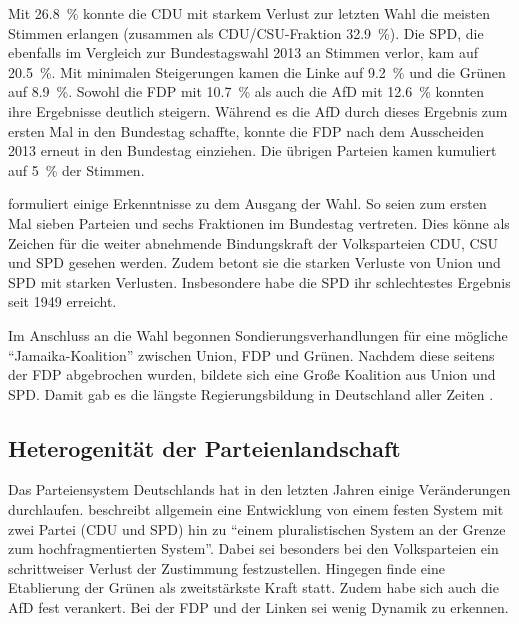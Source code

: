 Mit \SI{26.8}{\percent} konnte die \ac{CDU} mit starkem Verlust zur letzten Wahl die meisten Stimmen erlangen (zusammen als \ac{CDU}/\acs{CSU}-Fraktion \SI{32.9}{\percent}). Die \ac{SPD}, die ebenfalls im Vergleich zur Bundestagswahl \num{2013} an Stimmen verlor, kam auf \SI{20.5}{\percent}. Mit minimalen Steigerungen kamen die Linke auf \SI{9.2}{\percent} und die Grünen auf \SI{8.9}{\percent}. Sowohl die \ac{FDP} mit \SI{10.7}{\percent} als auch die \ac{AfD} mit \SI{12.6}{\percent} konnten ihre Ergebnisse deutlich steigern. Während es die \ac{AfD} durch dieses Ergebnis zum ersten Mal in den Bundestag schaffte, konnte die \ac{FDP} nach dem Ausscheiden \num{2013} erneut in den Bundestag einziehen. Die übrigen Parteien kamen kumuliert auf \SI{5}{\percent} der Stimmen.

\textcite{schmid_deutscher_2021} formuliert einige Erkenntnisse zu dem Ausgang der Wahl. So seien zum ersten Mal sieben Parteien und sechs Fraktionen im Bundestag vertreten. Dies könne als Zeichen für die weiter abnehmende Bindungskraft der Volksparteien \ac{CDU}, \ac{CSU} und \ac{SPD} gesehen werden. Zudem betont sie die starken Verluste von Union und \ac{SPD} mit starken Verlusten. Insbesondere habe die \ac{SPD} ihr schlechtestes Ergebnis seit \num{1949} erreicht.

Im Anschluss an die Wahl begonnen Sondierungsverhandlungen für eine mögliche \enquote{Jamaika-Koalition} zwischen Union, \ac{FDP} und Grünen. Nachdem diese seitens der \ac{FDP} abgebrochen wurden, bildete sich eine Große Koalition aus Union und \ac{SPD}. Damit gab es die längste Regierungsbildung in Deutschland aller Zeiten \parencite{schmid_deutscher_2021}.

\subsection{Heterogenität der Parteienlandschaft} \label{subsec:heterogenitätParteien}

Das Parteiensystem Deutschlands hat in den letzten Jahren einige Veränderungen durchlaufen. \textcite{niedermayer_entwicklung_2020} beschreibt allgemein eine Entwicklung von einem festen System mit zwei Partei (\ac{CDU} und \ac{SPD}) hin zu \enquote{einem pluralistischen System an der Grenze zum hochfragmentierten System}\parencite{niedermayer_entwicklung_2020}. Dabei sei besonders bei den Volksparteien ein schrittweiser Verlust der Zustimmung festzustellen. Hingegen finde eine Etablierung der Grünen als zweitstärkste Kraft statt. Zudem habe sich auch die \ac{AfD} fest verankert. Bei der \ac{FDP} und der Linken sei wenig Dynamik zu erkennen.

